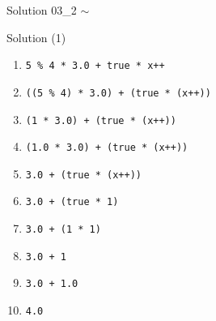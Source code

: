 \documentclass[handout,usenames,dvipsnames]{beamer}
\begin{document}
\begin{frame}[fragile]{Solution 03\_2 $\sim$ }
\begin{block}{Solution (1)}
\begin{enumerate}
\item \verb,5 % 4 * 3.0 + true * x++,
\item \verb,((5 % 4) * 3.0) + (true * (x++)),
\item \verb,(1 * 3.0) + (true * (x++)),
\item \verb,(1.0 * 3.0) + (true * (x++)),
\item \verb,3.0 + (true * (x++)),
\item \verb,3.0 + (true * 1),
\item \verb,3.0 + (1 * 1),
\item \verb,3.0 + 1,
\item \verb,3.0 + 1.0,
\item \verb,4.0,
\end{enumerate}
\end{block}
\end{frame}
\end{document}
